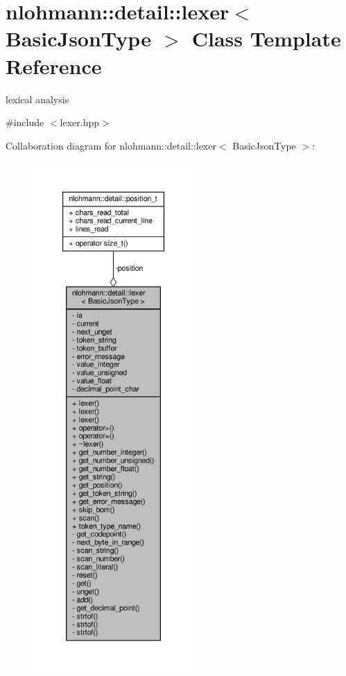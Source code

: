 \hypertarget{classnlohmann_1_1detail_1_1lexer}{}\section{nlohmann\+:\+:detail\+:\+:lexer$<$ Basic\+Json\+Type $>$ Class Template Reference}
\label{classnlohmann_1_1detail_1_1lexer}


lexical analysis  




{\ttfamily \#include $<$lexer.\+hpp$>$}



Collaboration diagram for nlohmann\+:\+:detail\+:\+:lexer$<$ Basic\+Json\+Type $>$\+:
\nopagebreak
\begin{figure}[H]
\begin{center}
\leavevmode
\includegraphics[height=550pt]{classnlohmann_1_1detail_1_1lexer__coll__graph}
\end{center}
\end{figure}
